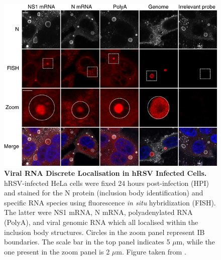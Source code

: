 \begin{figure}
    \centering
    \includegraphics[width=1\linewidth]{04. Introduction/Figs/11. RSV IBs.png}  
    \caption[Viral RNA Discrete Localisation in hRSV Infected Cells.]{\textbf{Viral RNA Discrete Localisation in hRSV Infected Cells.} hRSV-infected HeLa cells were fixed 24 hours post-infection (HPI) and stained for the N protein (inclusion body identification) and specific RNA species using fluorescence \textit{in situ} hybridization (FISH). The latter were NS1 mRNA, N mRNA, polyadenylated RNA (PolyA), and viral genomic RNA which all localised within the inclusion body structures. Circles in the zoom panel represent IB boundaries. The scale bar in the top panel indicates 5 \(\mu\)m, while the one present in the zoom panel is 2 \(\mu\)m. Figure taken from \cite{Rincheval2017FunctionalVirus}.}
    \label{fig:Viral RNA Discrete Localisation in hRSV Infected Cells}
\end{figure}

